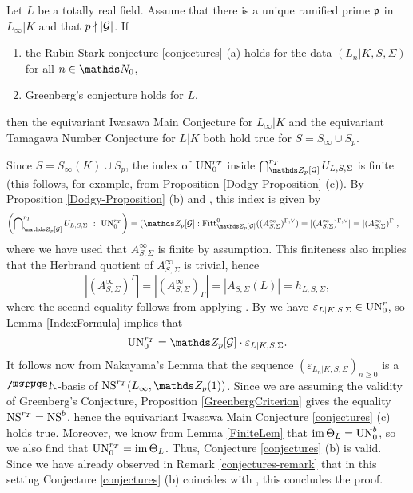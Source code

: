 \documentclass[a4paper, 
headsepline=off, DIV=12, titlepage=false]{scrartcl}
\begin{document}
\begin{thm} \label{etnc-thm}
    Let $L$ be a totally real field. Assume that there is a unique ramified prime $\mathfrak{p}$ in $L_\infty | K$ and that $p \nmid |\mathcal{G}|$. If 
    \begin{enumerate}[label=(\roman*)]
        \item the Rubin-Stark conjecture \ref{conjectures} (a) holds for the data $(L_n | K, S, \Sigma)$ for all $n \in \N_0$,
        \item Greenberg's conjecture holds for $L$,
    \end{enumerate}
    then the equivariant Iwasawa Main Conjecture \cite[Conj. 3.1]{BKS2} for $L_\infty | K$ and the equivariant Tamagawa Number Conjecture \cite[Conj. 2.3]{BKS2} for $L | K$ both hold true for $S = S_\infty \cup S_p$.
\end{thm}

\begin{proofbox}
Since $S = S_\infty (K) \cup S_p$, the index of $\mathrm{UN}^{r_T}_0$ inside $\bidual^{r_T}_{\Z_p [\cG]} U_{L, S, \Sigma}$ is finite (this follows, for example, from Proposition \ref{Dodgy-Proposition} (c)). By Proposition \ref{Dodgy-Proposition} (b) and \cite[Prop.\@ 7]{CornacchiaGreither}, this index is given by
\begin{align*}
    \left( \bidual^{r_T}_{\Z_p [\cG]} U_{L, S, \Sigma} \ : \ \UN^{r_T}_0 \right) &
    = ( \Z_p [\cG] : \Fitt^0_{\Z_p [\cG]} ((A_{S, \Sigma}^\infty)^{\Gamma, \vee} ) = | (A_{S, \Sigma}^\infty)^{\Gamma, \vee} | = | (A_{S, \Sigma}^\infty)^{\Gamma} |,
\end{align*}
where we have used that $A_{S, \Sigma}^\infty$ is finite by assumption. This finiteness also implies that the Herbrand quotient of $A_{S, \Sigma}^\infty$ is trivial, hence
\[
| (A_{S, \Sigma}^\infty)^\Gamma | = | (A_{S, \Sigma}^\infty)_\Gamma | = | A_{S, \Sigma} (L) | = h_{L, S, \Sigma},
\]
where the second equality follows from applying \cite[Prop. 13.22]{Washington}. By \cite[Prop. 6.1]{Rubin96} we have $\varepsilon_{L | K, S, \Sigma} \in \mathrm{UN}_0^r$, so Lemma \ref{IndexFormula} implies that
\[
\UN^{r_T}_0 = \Z_p [\cG] \cdot \varepsilon_{L | K, S, \Sigma}. 
\]
It follows now from Nakayama's Lemma that the sequence $(\varepsilon_{L_n | K, S, \Sigma})_{n \geq 0}$ is a $\bLambda$-basis of $\NS^{r_T} ( L_\infty, \Z_p (1))$. 
Since we are assuming the validity of Greenberg's Conjecture, Proposition \ref{GreenbergCriterion} gives the equality $\mathrm{NS}^{r_T} = \mathrm{NS}^b$, hence the equivariant Iwasawa Main Conjecture \ref{conjectures} (c) holds true. Moreover, we know from Lemma \ref{FiniteLem} that $\operatorname{im} \Theta_L = \mathrm{UN}^b_0$, so we also find that $\mathrm{UN}^{r_T}_0 = \operatorname{im} \Theta_L$. Thus, Conjecture \ref{conjectures} (b) is valid. Since we have already observed in Remark \ref{conjectures-remark} that in this setting Conjecture \ref{conjectures} (b) coincides with \cite[Conj. 2.3]{BKS2}, this concludes the proof. 
\end{proofbox}
\end{document}
